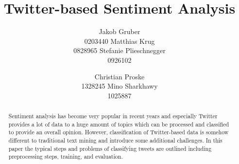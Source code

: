 \documentclass{acm_proc_article-sp}
\begin{document}
\title{Twitter-based Sentiment Analysis}

\author{
\alignauthor Jakob Gruber\\
      0203440
\alignauthor Matthias Krug\\
      0828965
\alignauthor Stefanie Plieschnegger\\
      0926102
\and
\alignauthor Christian Proske\\
      1328245
\alignauthor Mino Sharkhawy\\
      1025887
}

\maketitle
\begin{abstract} Sentiment analysis has become very popular in recent years and
    especially Twitter provides a lot of data to a huge amount of topics which
    can be processed and classified to provide an overall opinion. However,
    classification of Twitter-based data is somehow different to traditional
    text mining and introduce some additional challenges. In this paper the
    typical steps and problems of classifying tweets are outlined including
    preprocessing steps, training, and evaluation.  \end{abstract}



\end{document}
